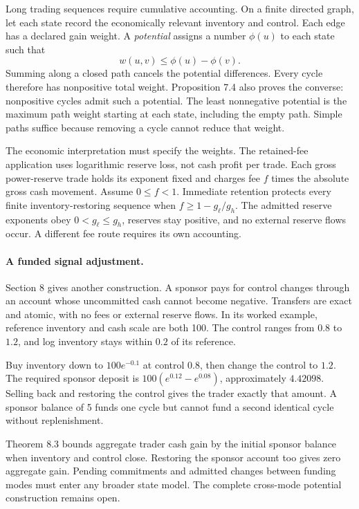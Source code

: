 \documentclass{momentum}
\begin{document}
Long trading sequences require cumulative accounting. On a finite directed graph, let each state record the economically relevant inventory and control. Each edge has a declared gain weight. A \emph{potential} assigns a number $\phi(u)$ to each state such that
\[
w(u,v)\leq\phi(u)-\phi(v).
\]
Summing along a closed path cancels the potential differences. Every cycle therefore has nonpositive total weight. Proposition 7.4 also proves the converse: nonpositive cycles admit such a potential. The least nonnegative potential is the maximum path weight starting at each state, including the empty path. Simple paths suffice because removing a cycle cannot reduce that weight.

The economic interpretation must specify the weights. The retained-fee application uses logarithmic reserve loss, not cash profit per trade. Each gross power-reserve trade holds its exponent fixed and charges fee $f$ times the absolute gross cash movement. Assume $0\leq f<1$. Immediate retention protects every finite inventory-restoring sequence when $f\geq1-g_\ell/g_h$. The admitted reserve exponents obey $0<g_\ell\leq g_h$, reserves stay positive, and no external reserve flows occur. A different fee route requires its own accounting.

\paragraph{A funded signal adjustment.}
Section 8 gives another construction. A sponsor pays for control changes through an account whose uncommitted cash cannot become negative. Transfers are exact and atomic, with no fees or external reserve flows. In its worked example, reference inventory and cash scale are both 100. The control ranges from $0.8$ to $1.2$, and log inventory stays within $0.2$ of its reference.

Buy inventory down to $100e^{-0.1}$ at control $0.8$, then change the control to $1.2$. The required sponsor deposit is $100(e^{0.12}-e^{0.08})$, approximately $4.42098$. Selling back and restoring the control gives the trader exactly that amount. A sponsor balance of 5 funds one cycle but cannot fund a second identical cycle without replenishment.

Theorem 8.3 bounds aggregate trader cash gain by the initial sponsor balance when inventory and control close. Restoring the sponsor account too gives zero aggregate gain. Pending commitments and admitted changes between funding modes must enter any broader state model. The complete cross-mode potential construction remains open.
\end{document}
